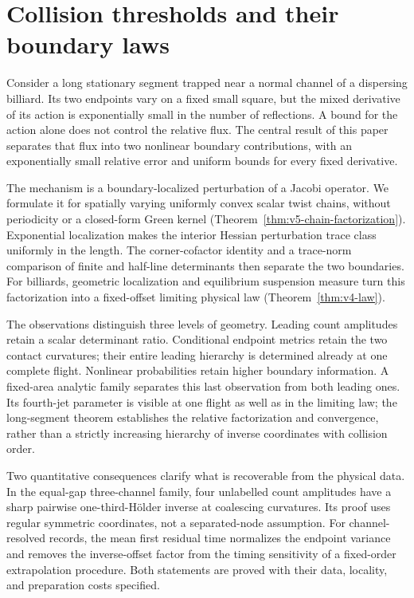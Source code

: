 \section{Collision thresholds and their boundary laws}
\label{sec:geometric-results}
Consider a long stationary segment trapped near a normal channel of a
dispersing billiard. Its two endpoints vary on a fixed small square,
but the mixed derivative of its action is exponentially small in the
number of reflections. A bound for the action alone does not control
the relative flux. The central result of this paper separates that
flux into two nonlinear boundary contributions, with an exponentially
small relative error and uniform bounds for every fixed derivative.

The mechanism is a boundary-localized perturbation of a Jacobi
operator. We formulate it for spatially varying uniformly convex scalar
twist chains, without periodicity or a closed-form Green kernel
(Theorem~\ref{thm:v5-chain-factorization}). Exponential localization
makes the interior Hessian perturbation trace class uniformly in the
length. The corner-cofactor identity and a trace-norm comparison of
finite and half-line determinants then separate the two boundaries.
For billiards, geometric localization and equilibrium suspension
measure turn this factorization into a fixed-offset limiting physical
law (Theorem~\ref{thm:v4-law}).

The observations distinguish three levels of geometry. Leading count
amplitudes retain a scalar determinant ratio. Conditional endpoint
metrics retain the two contact curvatures; their entire leading
hierarchy is determined already at one complete flight. Nonlinear
probabilities retain higher boundary information. A fixed-area analytic
family separates this last observation from both leading ones. Its
fourth-jet parameter is visible at one flight as well as in the limiting
law; the long-segment theorem establishes the relative factorization
and convergence, rather than a strictly increasing hierarchy of inverse
coordinates with collision order.

Two quantitative consequences clarify what is recoverable from the
physical data. In the equal-gap three-channel family, four unlabelled
count amplitudes have a sharp pairwise one-third-H\"older inverse at
coalescing curvatures. Its proof uses regular symmetric coordinates,
not a separated-node assumption. For channel-resolved records, the
mean first residual time normalizes the endpoint variance and removes
the inverse-offset factor from the timing sensitivity of a fixed-order
extrapolation procedure. Both statements are proved with their data,
locality, and preparation costs specified.

